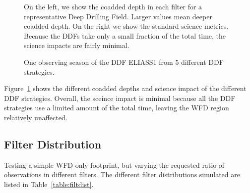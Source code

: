 \begin{figure}
\caption{On the left, we show the coadded depth in each filter for a representative Deep Drilling Field. Larger values mean deeper coadded depth. On the right we show the standard science metrics.  Because the DDFs take only a small fraction of the total time, the science impacts are fairly minimal.}\label{fig:ddf_differences}
\end{figure}

\begin{figure}
\caption{One observing season of the DDF ELIASS1 from 5 different DDF strategies. }\label{fig:ddfexamples}
\end{figure}

Figure~\ref{fig:ddf_differences} shows the different coadded depths and science impact of the different DDF strategies. Overall, the sceince impact is minimal because all the DDF strategies use a limited amount of the total time, leaving the WFD region relatively unaffected. 

\subsection{Filter Distribution}

Testing a simple WFD-only footprint, but varying the requested ratio of observations in different filters. The different filter distributions simulated are listed in Table~\ref{table:filtdist}.  


